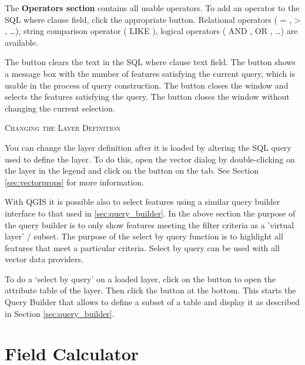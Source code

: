 The \textbf{Operators section} contains all usable operators. To add an operator 
to the SQL where clause field, click the appropriate button. Relational operators 
( = , > , \dots), string comparison operator ( LIKE ), logical operators ( AND , OR 
, \dots) are available. 

The  button clears the text in the SQL where clause text field. The 
 button shows a message box with the number of features satisfying 
the current query, which is usable in the process of query construction. The 
 button closes the window and selects the features satisfying the 
query. The  button closes the window without changing the current 
selection. 

\begin{Tip}\caption{\textsc{Changing the Layer Definition}}
You can change the layer definition after it is loaded by altering
the SQL query used to define the layer. To do this, open the 
vector  dialog by double-clicking on the layer in the legend and click on the
 button on the  tab. See Section
\ref{sec:vectorprops} for more information.
\end{Tip}

\label{sec:select_by_query}

With QGIS it is possible also to select features using a similar query builder 
interface to that used in \ref{sec:query_builder}. In the above section 
the purpose of the query builder is to only show features meeting the 
filter criteria as a 'virtual layer' / subset. The purpose of the select by 
query function is to highlight all features that meet a particular criteria. 
Select by query can be used with all vector data providers.

To do a `select by query' on a loaded layer, click on the 
button  to open the attribute table of the layer. Then 
click the  button at the bottom. This starts the Query Builder 
that allows to define a subset of a table and display it as described in Section 
\ref{sec:query_builder}.

\section{Field Calculator}\label{sec:field_calculator}

